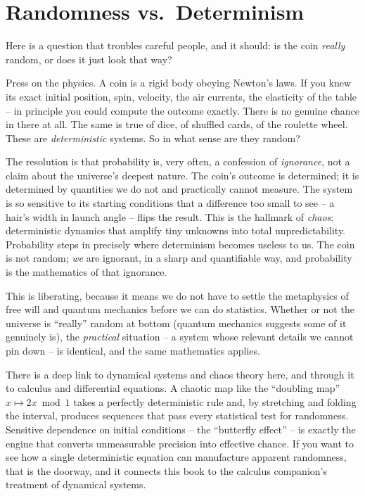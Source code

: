 \section{Randomness vs.\ Determinism}
\label{ch01:randomness}

Here is a question that troubles careful people, and it should: is the coin
\emph{really} random, or does it just look that way?

Press on the physics. A coin is a rigid body obeying Newton's laws. If you knew
its exact initial position, spin, velocity, the air currents, the elasticity of the
table -- in principle you could compute the outcome exactly. There is no genuine
chance in there at all. The same is true of dice, of shuffled cards, of the
roulette wheel. These are \emph{deterministic} systems. So in what sense are they
random?

\begin{focusbox}
The resolution is that probability is, very often, a confession of
\emph{ignorance}, not a claim about the universe's deepest nature. The coin's
outcome is determined; it is determined by quantities we do not and practically
cannot measure. The system is so sensitive to its starting conditions that a
difference too small to see -- a hair's width in launch angle -- flips the result.
This is the hallmark of \emph{chaos}: deterministic dynamics that amplify tiny
unknowns into total unpredictability. Probability steps in precisely where
determinism becomes useless to us. The coin is not random; \emph{we} are
ignorant, in a sharp and quantifiable way, and probability is the mathematics of
that ignorance.
\end{focusbox}

This is liberating, because it means we do not have to settle the metaphysics of
free will and quantum mechanics before we can do statistics. Whether or not the
universe is ``really'' random at bottom (quantum mechanics suggests some of it
genuinely is), the \emph{practical} situation -- a system whose relevant details we
cannot pin down -- is identical, and the same mathematics applies.

\begin{connectionbox}
There is a deep link to dynamical systems and chaos theory here, and through it to
calculus and differential equations. A chaotic map like the ``doubling map''
$x \mapsto 2x \bmod 1$ takes a perfectly deterministic rule and, by stretching and
folding the interval, produces sequences that pass every statistical test for
randomness. Sensitive dependence on initial conditions -- the ``butterfly effect''
-- is exactly the engine that converts unmeasurable precision into effective
chance. If you want to see how a single deterministic equation can manufacture
apparent randomness, that is the doorway, and it connects this book to the calculus
companion's treatment of dynamical systems.
\end{connectionbox}

